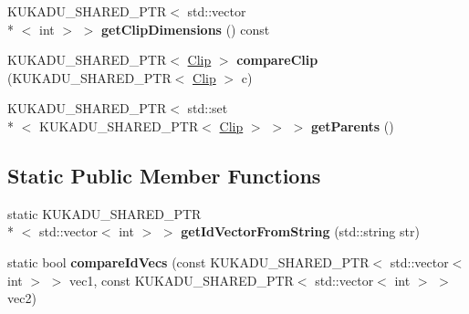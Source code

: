 \begin{DoxyCompactItemize}
\item 
\hypertarget{classkukadu_1_1Clip_ad68e8835167a1bd4197819891f3114e5}{K\-U\-K\-A\-D\-U\-\_\-\-S\-H\-A\-R\-E\-D\-\_\-\-P\-T\-R$<$ std\-::vector\\*
$<$ int $>$ $>$ {\bfseries get\-Clip\-Dimensions} () const }\label{classkukadu_1_1Clip_ad68e8835167a1bd4197819891f3114e5}

\item 
\hypertarget{classkukadu_1_1Clip_a31c64a7290c936dc63b48b47ba563297}{K\-U\-K\-A\-D\-U\-\_\-\-S\-H\-A\-R\-E\-D\-\_\-\-P\-T\-R$<$ \hyperlink{classkukadu_1_1Clip}{Clip} $>$ {\bfseries compare\-Clip} (K\-U\-K\-A\-D\-U\-\_\-\-S\-H\-A\-R\-E\-D\-\_\-\-P\-T\-R$<$ \hyperlink{classkukadu_1_1Clip}{Clip} $>$ c)}\label{classkukadu_1_1Clip_a31c64a7290c936dc63b48b47ba563297}

\item 
\hypertarget{classkukadu_1_1Clip_aac76795ec89a39adb9b02a7b87f27cb9}{K\-U\-K\-A\-D\-U\-\_\-\-S\-H\-A\-R\-E\-D\-\_\-\-P\-T\-R$<$ std\-::set\\*
$<$ K\-U\-K\-A\-D\-U\-\_\-\-S\-H\-A\-R\-E\-D\-\_\-\-P\-T\-R$<$ \hyperlink{classkukadu_1_1Clip}{Clip} $>$ $>$ $>$ {\bfseries get\-Parents} ()}\label{classkukadu_1_1Clip_aac76795ec89a39adb9b02a7b87f27cb9}

\end{DoxyCompactItemize}
\subsection*{Static Public Member Functions}
\begin{DoxyCompactItemize}
\item 
\hypertarget{classkukadu_1_1Clip_a4aeb1954ae45ed377d3563c79f083329}{static K\-U\-K\-A\-D\-U\-\_\-\-S\-H\-A\-R\-E\-D\-\_\-\-P\-T\-R\\*
$<$ std\-::vector$<$ int $>$ $>$ {\bfseries get\-Id\-Vector\-From\-String} (std\-::string str)}\label{classkukadu_1_1Clip_a4aeb1954ae45ed377d3563c79f083329}

\item 
\hypertarget{classkukadu_1_1Clip_aa8186f0de64ebc0a45c502619c38b020}{static bool {\bfseries compare\-Id\-Vecs} (const K\-U\-K\-A\-D\-U\-\_\-\-S\-H\-A\-R\-E\-D\-\_\-\-P\-T\-R$<$ std\-::vector$<$ int $>$ $>$ vec1, const K\-U\-K\-A\-D\-U\-\_\-\-S\-H\-A\-R\-E\-D\-\_\-\-P\-T\-R$<$ std\-::vector$<$ int $>$ $>$ vec2)}\label{classkukadu_1_1Clip_aa8186f0de64ebc0a45c502619c38b020}

\end{DoxyCompactItemize}
